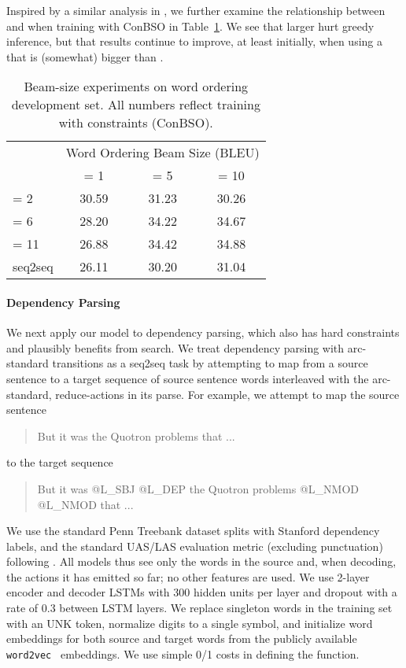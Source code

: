 \documentclass[11pt,letterpaper]{article}
\begin{document}
Inspired by a similar analysis in , we further examine the relationship between  and  when training with ConBSO in Table~\ref{tab:wosizeexp}. We see that larger  hurt greedy inference, but that results continue to improve, at least initially, when using a  that is (somewhat) bigger than .
\begin{table}
  \centering
  \begin{tabular}{lccc}
    \toprule
    & \multicolumn{3}{c}{Word Ordering Beam Size (BLEU) } \\ 
    &   = 1 &  = 5 &  = 10 \\ 
    \midrule
     = 2 & 30.59 & 31.23 & 30.26 \\
     = 6 & 28.20 & 34.22 & 34.67 \\
     = 11 & 26.88 & 34.42 & 34.88 \\   
    \midrule
    seq2seq & 26.11 & 30.20 & 31.04 \\         
    \bottomrule
  \end{tabular}
  \caption{Beam-size experiments on word ordering development set. All numbers reflect training with constraints (ConBSO).}
  \label{tab:wosizeexp}
\end{table}



\paragraph{Dependency Parsing}
We next apply our model to dependency parsing, which also has hard constraints and plausibly benefits from search. We treat dependency parsing with arc-standard transitions as a seq2seq task by attempting to map from a source sentence to a target sequence of source sentence words interleaved with the arc-standard, reduce-actions in its parse. For example, we attempt to map the source sentence \begin{quote}
But it was the Quotron problems that  ...
\end{quote} to the target sequence \begin{quote}
But it was @L\_SBJ @L\_DEP the Quotron problems @L\_NMOD @L\_NMOD that ...
\end{quote}
We use the standard Penn Treebank dataset splits with Stanford dependency labels, and the standard UAS/LAS evaluation metric (excluding punctuation) following  . All models thus see only the words in the source and, when decoding, the actions it has emitted so far; no other features are used. We use 2-layer encoder and decoder LSTMs with 300 hidden units per layer and dropout with a rate of 0.3 between LSTM layers. We replace singleton words in the training set with an UNK token, normalize digits to a single symbol, and initialize word embeddings for both source and target words from the publicly available \texttt{word2vec}~\cite{mikolov2013distributed} embeddings. We use simple 0/1 costs in defining the  function. 
\end{document}
